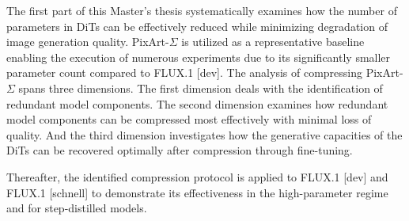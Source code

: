    The first part of this Master's thesis systematically examines how the number of parameters in \gls{DiT}s can be effectively reduced while minimizing degradation of image generation quality. PixArt-$\Sigma$ \cite{Pixart_s} is utilized as a representative baseline enabling the execution of numerous experiments due to its significantly smaller parameter count compared to FLUX.1 [dev]. The analysis of compressing PixArt-$\Sigma$ spans three dimensions. The first dimension deals with the identification of redundant model components. The second dimension examines how redundant model components can be compressed most effectively with minimal loss of quality. And the third dimension investigates how the generative capacities of the \gls{DiT}s can be recovered optimally after compression through fine-tuning. 
   
   Thereafter, the identified compression protocol is applied to FLUX.1 [dev] and FLUX.1 [schnell] to demonstrate its effectiveness in the high-parameter regime and for step-distilled models. 
   

	
